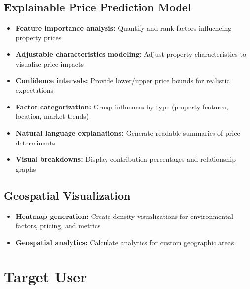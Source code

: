 \subsection{Explainable Price Prediction Model}  
\begin{itemize}  
    \item \textbf{Feature importance analysis:} Quantify and rank factors influencing property prices  
    \item \textbf{Adjustable characteristics modeling:} Adjust property characteristics to visualize price impacts  
    \item \textbf{Confidence intervals:} Provide lower/upper price bounds for realistic expectations  
    \item \textbf{Factor categorization:} Group influences by type (property features, location, market trends)  
    \item \textbf{Natural language explanations:} Generate readable summaries of price determinants  
    \item \textbf{Visual breakdowns:} Display contribution percentages and relationship graphs  
\end{itemize}  
  
\subsection{Geospatial Visualization}  
\begin{itemize}  
    \item \textbf{Heatmap generation:} Create density visualizations for environmental factors, pricing, and metrics  
    \item \textbf{Geospatial analytics:} Calculate analytics for custom geographic areas  
\end{itemize}
\newpage

\section{Target User}


